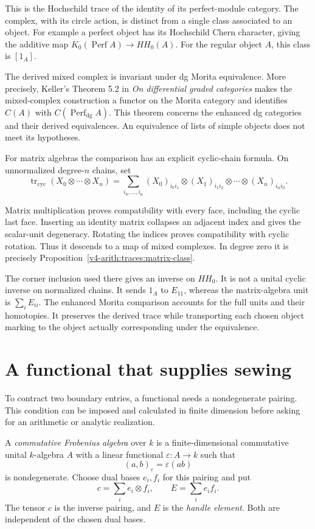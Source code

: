 This is the Hochschild trace of the identity of its perfect-module category.
The complex, with its circle action, is distinct from a single class
associated to an object. For example a perfect object has its Hochschild
Chern character, giving the additive map $K_0(\operatorname{Perf}A)\to
HH_0(A)$. For the regular object $A$, this class is $[1_A]$.

The derived mixed complex is invariant under dg Morita equivalence. More
precisely, Keller's Theorem 5.2 in \emph{On differential graded categories}
makes the mixed-complex construction a functor on the Morita category and
identifies $C(A)$ with $C(\operatorname{Perf}_{\mathrm{dg}}A)$. This theorem
concerns the enhanced dg categories and their derived equivalences. An
equivalence of lists of simple objects does not meet its hypotheses.

For matrix algebras the comparison has an explicit cyclic-chain formula. On
unnormalized degree-$n$ chains, set
\[
 \operatorname{tr}_{\mathrm{cyc}}
       (X_0\otimes\cdots\otimes X_n)
   =\sum_{i_0,\ldots,i_n}
       (X_0)_{i_0i_1}\otimes
       (X_1)_{i_1i_2}\otimes\cdots\otimes
       (X_n)_{i_ni_0}.
\]

Matrix multiplication proves compatibility with every face, including the
cyclic last face. Inserting an identity matrix collapses an adjacent index
and gives the scalar-unit degeneracy. Rotating the indices proves
compatibility with cyclic rotation. Thus it descends to a map of mixed
complexes. In degree zero it is precisely
Proposition~\ref{v4-arith:traces:matrix-class}.

The corner inclusion used there gives an inverse on $HH_0$. It is not a
unital cyclic inverse on normalized chains. It sends $1_A$ to $E_{11}$,
whereas the matrix-algebra unit is $\sum_iE_{ii}$. The enhanced Morita
comparison accounts for the full units and their homotopies. It preserves
the derived trace while transporting each chosen object marking to the
object actually corresponding under the equivalence.

\section{A functional that supplies sewing}

To contract two boundary entries, a functional needs a nondegenerate
pairing. This condition can be imposed and calculated in finite dimension
before asking for an arithmetic or analytic realization.

\begin{definition}
\label{v4-arith:traces:frobenius}
A \emph{commutative Frobenius algebra} over $k$ is a finite-dimensional
commutative unital $k$-algebra $A$ with a linear functional
$\varepsilon:A\to k$ such that
\[
 (a,b)_\varepsilon=\varepsilon(ab)
\]
is nondegenerate. Choose dual bases $e_i,f_i$ for this pairing and put
\[
 c=\sum_i e_i\otimes f_i,\qquad
 E=\sum_i e_if_i.
\]
The tensor $c$ is the inverse pairing, and $E$ is the \emph{handle element}.
Both are independent of the chosen dual bases.
\end{definition}

